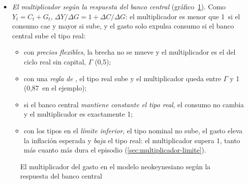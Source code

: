 \documentclass[11pt]{article}
\begin{document}
\begin{itemize}
\begin{itemize}
  \item \emph{Paso 3, el resultado clave}: con la regla de , el multiplicador es una media ponderada de 1~y de $\Gamma$,
    Cuanto más agresiva la regla ($\phi_\pi$, $\phi_x$ mayores) y más flexibles los precios ($\kappa$ mayor), mayor es $\Omega$ y más se acerca el multiplicador al neoclásico, $\Gamma$, porque el banco central neutraliza el estímulo; con un banco central que no reacciona, $\Omega=0$ y el multiplicador es 1.\footnote{$\Omega$ es local. Con $\beta=0{,}99$, $\theta=\varphi=1$, $\kappa=0{,}02$, $\phi_\pi=1{,}5$, $\phi_x=0$ y $\rho_G=0{,}8$, $\Omega\approx0{,}34$ y $m\approx0{,}87$.}
  \end{itemize}
\item \emph{El multiplicador según la respuesta del banco central} (gráfico~\ref{fig:nek-gasto}). Como $Y_t=C_t+G_t$, $\Delta Y/\Delta G=1+\Delta C/\Delta G$: el multiplicador es menor que 1~si el consumo cae y mayor si sube, y el gasto solo expulsa consumo si el banco central sube el tipo real:
  \begin{itemize}
  \item con \emph{precios flexibles}, la brecha no se mueve y el multiplicador es el del ciclo real sin capital, $\Gamma$ (0,5);
  \item con una \emph{regla de }, el tipo real sube y el multiplicador queda entre $\Gamma$ y 1 (0,87~en el ejemplo);
  \item si el banco central \emph{mantiene constante el tipo real}, el consumo no cambia y el multiplicador es exactamente 1;
  \item con los tipos en el \emph{límite inferior}, el tipo nominal no sube, el gasto eleva la inflación esperada y \emph{baja} el tipo real: el multiplicador supera 1, tanto más cuanto más dura el episodio (\ref{sec:multiplicador-limite}).
  \end{itemize}
\end{itemize}

\begin{figure}[H]
\centering
\caption{El multiplicador del gasto en el modelo neokeynesiano según la respuesta del banco central}\label{fig:nek-gasto}
\end{figure}
\end{document}
